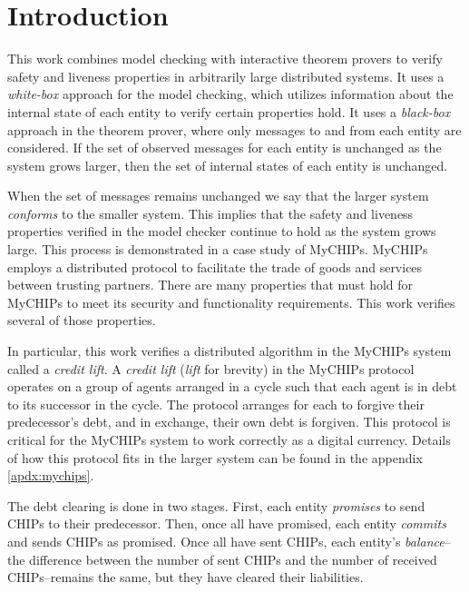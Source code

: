 \documentclass[runningheads]{llncs}
\begin{document}




\section{Introduction}
\label{chap:introduction}
This work combines model checking with interactive theorem provers to verify safety and liveness properties in arbitrarily large distributed systems.
It uses a \emph{white-box} approach for the model checking, which utilizes information about the internal state of each entity to verify certain properties hold.
It uses a \emph{black-box} approach in the theorem prover, where only messages to and from each entity are considered.
If the set of observed messages for each entity is unchanged as the system grows larger, then the set of internal states of each entity is unchanged.

When the set of messages remains unchanged we say that the larger system \emph{conforms} to the smaller system\cite{dill_trace_theory}. This implies that the safety and liveness properties verified in the model checker continue to hold as the system grows large.
This process is demonstrated in a case study of MyCHIPs. MyCHIPs employs a distributed protocol to facilitate the trade of goods and services between trusting partners. There are many properties that must hold for MyCHIPs to meet its security and functionality requirements. This work verifies several of those properties.

In particular, this work verifies a distributed algorithm in the MyCHIPs system called a \emph{credit lift}. A \emph{credit lift} (\emph{lift} for brevity) in the MyCHIPs protocol operates on a group of agents arranged in a cycle such that each agent is in debt to its successor in the cycle. The protocol arranges for each to forgive their predecessor's debt, and in exchange, their own debt is forgiven. This protocol is critical for the MyCHIPs system to work correctly as a digital currency. Details of how this protocol fits in the larger system can be found in the appendix \ref{apdx:mychips}.

The debt clearing is done in two stages. First, each entity \emph{promises} to send CHIPs to their predecessor. Then, once all have promised, each entity \emph{commits} and sends CHIPs as promised. Once all have sent CHIPs, each entity's \emph{balance}--the difference between the number of sent CHIPs and the number of received CHIPs--remains the same, but they have cleared their liabilities. 
\end{document}
